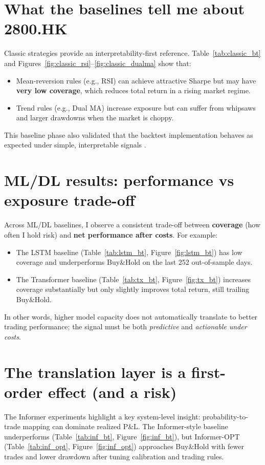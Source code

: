 \documentclass[12pt,a4paper,oneside]{report}
\begin{document}
\section{What the baselines tell me about 2800.HK}
Classic strategies provide an interpretability-first reference. Table~\ref{tab:classic_bt} and Figures~\ref{fig:classic_rsi}--\ref{fig:classic_dualma} show that:
\begin{itemize}
  \item Mean-reversion rules (e.g., RSI) can achieve attractive Sharpe but may have \textbf{very low coverage}, which reduces total return in a rising market regime.
  \item Trend rules (e.g., Dual MA) increase exposure but can suffer from whipsaws and larger drawdowns when the market is choppy.
\end{itemize}
This baseline phase also validated that the backtest implementation behaves as expected under simple, interpretable signals \citep{chan2013}.

\section{ML/DL results: performance vs exposure trade-off}
Across ML/DL baselines, I observe a consistent trade-off between \textbf{coverage} (how often I hold risk) and \textbf{net performance after costs}. For example:
\begin{itemize}
  \item The LSTM baseline (Table~\ref{tab:lstm_bt}, Figure~\ref{fig:lstm_bt}) has low coverage and underperforms Buy\&Hold on the last 252 out-of-sample days.
  \item The Transformer baseline (Table~\ref{tab:tx_bt}, Figure~\ref{fig:tx_bt}) increases coverage substantially but only slightly improves total return, still trailing Buy\&Hold.
\end{itemize}
In other words, higher model capacity does not automatically translate to better trading performance; the signal must be both \emph{predictive} and \emph{actionable under costs}.

\section{The translation layer is a first-order effect (and a risk)}
The Informer experiments highlight a key system-level insight: probability-to-trade mapping can dominate realized P\&L. The Informer-style baseline underperforms (Table~\ref{tab:inf_bt}, Figure~\ref{fig:inf_bt}), but Informer-OPT (Table~\ref{tab:inf_opt}, Figure~\ref{fig:inf_opt}) approaches Buy\&Hold with fewer trades and lower drawdown after tuning calibration and trading rules.
\end{document}
